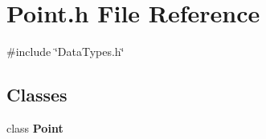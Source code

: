 \section{Point.\+h File Reference}
\label{_point_8h}
{\ttfamily \#include \char`\"{}Data\+Types.\+h\char`\"{}}\newline
\subsection*{Classes}
\begin{DoxyCompactItemize}
\item 
class \textbf{ Point}
\end{DoxyCompactItemize}
